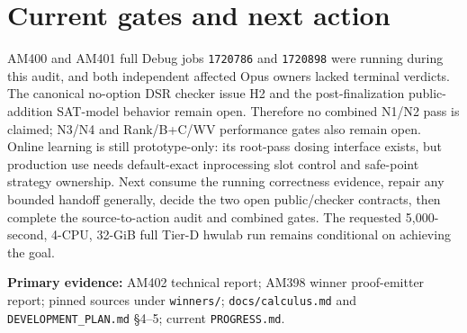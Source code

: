 \documentclass[11pt]{article}
\newcommand{\code}[1]{\texttt{#1}}
\begin{document}
\section*{Current gates and next action}
AM400 and AM401 full Debug jobs \code{1720786} and \code{1720898} were running during this audit, and both independent affected Opus owners lacked terminal verdicts. The canonical no-option DSR checker issue H2 and the post-finalization public-addition SAT-model behavior remain open. Therefore no combined N1/N2 pass is claimed; N3/N4 and Rank/B+C/WV performance gates also remain open. Online learning is still prototype-only: its root-pass dosing interface exists, but production use needs default-exact inprocessing slot control and safe-point strategy ownership. Next consume the running correctness evidence, repair any bounded handoff generally, decide the two open public/checker contracts, then complete the source-to-action audit and combined gates. The requested 5,000-second, 4-CPU, 32-GiB full Tier-D hwulab run remains conditional on achieving the goal.

\noindent\textbf{Primary evidence:} AM402 technical report; AM398 winner proof-emitter report; pinned sources under \code{winners/}; \code{docs/calculus.md} and \code{DEVELOPMENT\_PLAN.md} \S4--5; current \code{PROGRESS.md}.
\end{document}
